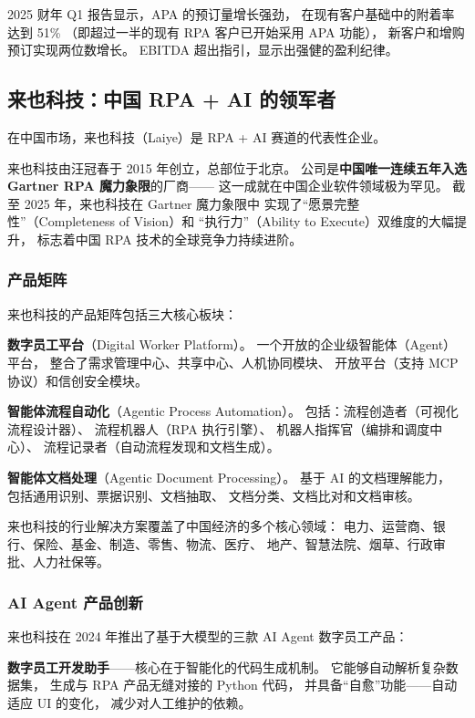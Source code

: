 2025 财年 Q1 报告显示，APA 的预订量增长强劲，
在现有客户基础中的附着率达到 51\%
（即超过一半的现有 RPA 客户已开始采用 APA 功能），
新客户和增购预订实现两位数增长。
EBITDA 超出指引，显示出强健的盈利纪律。

\subsection{来也科技：中国 RPA + AI 的领军者}

在中国市场，来也科技（Laiye）是 RPA + AI 赛道的代表性企业。

来也科技由汪冠春于 2015 年创立，总部位于北京。
公司是\textbf{中国唯一连续五年入选 Gartner RPA 魔力象限}的厂商——
这一成就在中国企业软件领域极为罕见。
截至 2025 年，来也科技在 Gartner 魔力象限中
实现了``愿景完整性''（Completeness of Vision）和
``执行力''（Ability to Execute）双维度的大幅提升，
标志着中国 RPA 技术的全球竞争力持续进阶。

\subsubsection{产品矩阵}
来也科技的产品矩阵包括三大核心板块：

\textbf{数字员工平台}（Digital Worker Platform）。
一个开放的企业级智能体（Agent）平台，
整合了需求管理中心、共享中心、人机协同模块、
开放平台（支持 MCP 协议）和信创安全模块。

\textbf{智能体流程自动化}（Agentic Process Automation）。
包括：流程创造者（可视化流程设计器）、
流程机器人（RPA 执行引擎）、
机器人指挥官（编排和调度中心）、
流程记录者（自动流程发现和文档生成）。

\textbf{智能体文档处理}（Agentic Document Processing）。
基于 AI 的文档理解能力，
包括通用识别、票据识别、文档抽取、
文档分类、文档比对和文档审核。

来也科技的行业解决方案覆盖了中国经济的多个核心领域：
电力、运营商、银行、保险、基金、制造、零售、物流、医疗、
地产、智慧法院、烟草、行政审批、人力社保等。

\subsubsection{AI Agent 产品创新}
来也科技在 2024 年推出了基于大模型的三款 AI Agent 数字员工产品：

\textbf{数字员工开发助手}——核心在于智能化的代码生成机制。
它能够自动解析复杂数据集，
生成与 RPA 产品无缝对接的 Python 代码，
并具备``自愈''功能——自动适应 UI 的变化，
减少对人工维护的依赖。

